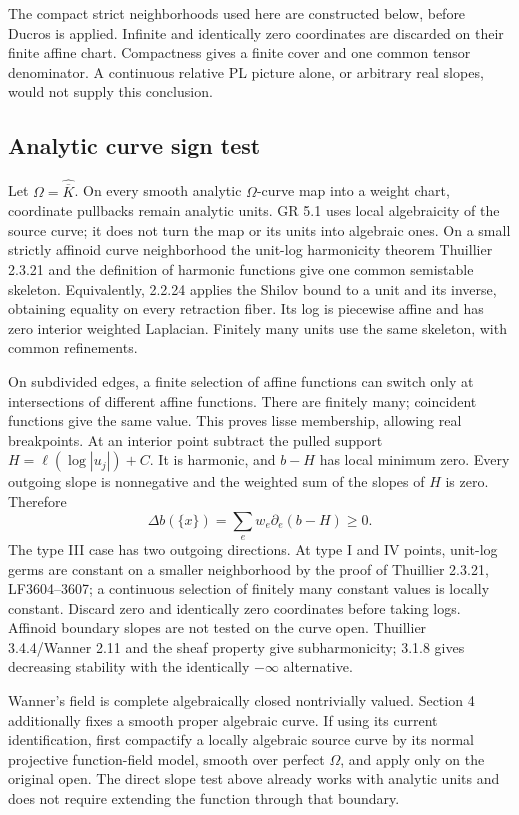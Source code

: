 \documentclass[
  10pt,
]{article}
\begin{document}
The compact strict neighborhoods used here are constructed below, before
Ducros is applied. Infinite and identically zero coordinates are
discarded on their finite affine chart. Compactness gives a finite cover
and one common tensor denominator. A continuous relative PL picture
alone, or arbitrary real slopes, would not supply this conclusion.

\subsection{Analytic curve sign test}\label{analytic-curve-sign-test}

Let \(\Omega=\widehat{\overline K}\). On every smooth analytic
\(\Omega\)-curve map into a weight chart, coordinate pullbacks remain
analytic units. GR 5.1 uses local algebraicity of the source curve; it
does not turn the map or its units into algebraic ones. On a small
strictly affinoid curve neighborhood the unit-log harmonicity theorem
Thuillier 2.3.21 and the definition of harmonic functions give one
common semistable skeleton. Equivalently, 2.2.24 applies the Shilov
bound to a unit and its inverse, obtaining equality on every retraction
fiber. Its log is piecewise affine and has zero interior weighted
Laplacian. Finitely many units use the same skeleton, with common
refinements.

On subdivided edges, a finite selection of affine functions can switch
only at intersections of different affine functions. There are finitely
many; coincident functions give the same value. This proves lisse
membership, allowing real breakpoints. At an interior point subtract the
pulled support \(H=\ell(\log|u_j|)+C\). It is harmonic, and \(b-H\) has
local minimum zero. Every outgoing slope is nonnegative and the weighted
sum of the slopes of \(H\) is zero. Therefore
\[\Delta b(\{x\})=\sum_e w_e\partial_e(b-H)\ge0. \tag{10}\] The type III
case has two outgoing directions. At type I and IV points, unit-log
germs are constant on a smaller neighborhood by the proof of Thuillier
2.3.21, LF3604--3607; a continuous selection of finitely many constant
values is locally constant. Discard zero and identically zero
coordinates before taking logs. Affinoid boundary slopes are not tested
on the curve open. Thuillier 3.4.4/Wanner 2.11 and the sheaf property
give subharmonicity; 3.1.8 gives decreasing stability with the
identically \(-\infty\) alternative.

Wanner's field is complete algebraically closed nontrivially valued.
Section 4 additionally fixes a smooth proper algebraic curve. If using
its current identification, first compactify a locally algebraic source
curve by its normal projective function-field model, smooth over perfect
\(\Omega\), and apply only on the original open. The direct slope test
above already works with analytic units and does not require extending
the function through that boundary.
\end{document}
